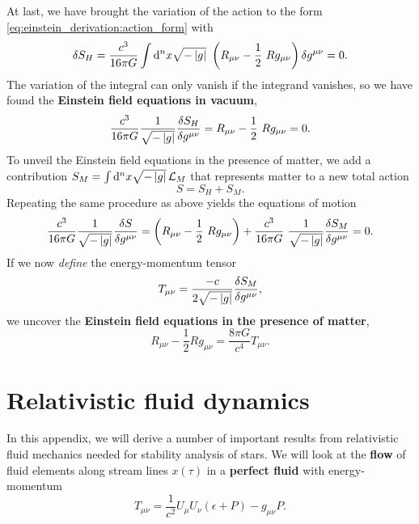 At last, we have brought the variation of the action to the form \eqref{eq:einstein_derivation:action_form} with
\begin{equation}
	\variation{S_H} = \frac{c^3}{16 \pi G} \int \dif^n x \sqrt{-\det{g}} \left( R_{\mu \nu} - \frac{1}{2} R g_{\mu \nu} \right) \variation{g^{\mu \nu}} = 0 .
\end{equation}
The variation of the integral can only vanish if the integrand vanishes, so we have found the \textbf{Einstein field equations in vacuum},
\begin{equation}
	 \frac{c^3}{16 \pi G} \frac{1}{\sqrt{-\det{g}}} \fdv{S_H}{g^{\mu \nu}} = R_{\mu \nu} - \frac{1}{2} R g_{\mu \nu} = 0 .
	\label{eq:einstein_derivation:einstein_vacuum}
\end{equation}
To unveil the Einstein field equations in the presence of matter, we add a contribution $S_M = \int \mathop{}\!\mathrm{d}^n x \sqrt{-\left\lvert g \right\rvert} \, \mathcal{L}_M$ that represents matter to a new total action
\begin{equation}
	S = S_H + S_M .
\end{equation}
Repeating the same procedure as above yields the equations of motion
\begin{equation}
	\frac{c^3}{16 \pi G} \frac{1}{\sqrt{-\det{g}}} \fdv{S}{g^{\mu \nu}} = \left( R_{\mu \nu} - \frac{1}{2} R g_{\mu \nu} \right) + \frac{c^3}{16 \pi G} \frac{1}{\sqrt{-\det{g}}} \frac{\variation{S_M}}{\variation{g^{\mu \nu}}} = 0 .
\end{equation}
If we now \emph{define} the energy-momentum tensor
\begin{equation}
	T_{\mu \nu} = \frac{-c}{2 \sqrt{-\left\lvert g \right\rvert}} \frac{\delta S_M}{\delta g^{\mu \nu}} ,
\end{equation}
we uncover the \textbf{Einstein field equations in the presence of matter},
\begin{equation}
	R_{\mu \nu} - \frac{1}{2} R g_{\mu \nu} = \frac{8 \pi G}{c^4} T_{\mu \nu} .
	\label{eq:einstein_derivation:einstein_matter}
\end{equation}


\chapter{Relativistic fluid dynamics}
\label{chap:relfluid}

In this appendix, we will derive a number of important results from relativistic fluid mechanics needed for stability analysis of stars.
We will look at the \textbf{flow} of fluid elements along stream lines $x(\tau)$ in a \textbf{perfect fluid} with energy-momentum
\begin{equation}
	T_{\mu \nu} = \frac{1}{c^2} U_\mu U_\nu (\epsilon + P) - g_{\mu \nu} P .
\end{equation}


